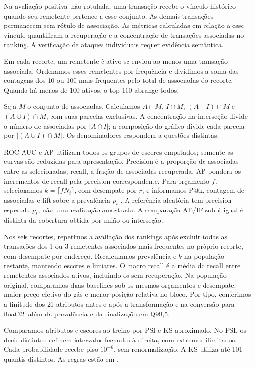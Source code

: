 Na avaliação positiva--não rotulada, uma transação recebe o vínculo histórico quando seu remetente pertence a esse conjunto. As demais transações permanecem sem rótulo de associação. As métricas calculadas em relação a esse vínculo quantificam a recuperação e a concentração de transações associadas no ranking. A verificação de ataques individuais requer evidência semântica.

Em cada recorte, um remetente é ativo se enviou ao menos uma transação associada. Ordenamos esses remetentes por frequência e dividimos a soma das contagens dos 10 ou 100 mais frequentes pelo total de associadas do recorte. Quando há menos de 100 ativos, o top-100 abrange todos.

Seja $M$ o conjunto de associadas. Calculamos $A\cap M$, $I\cap M$, $(A\cap I)\cap M$ e $(A\cup I)\cap M$, com suas parcelas exclusivas. A concentração na interseção divide o número de associadas por $|A\cap I|$; a composição do gráfico divide cada parcela por $|(A\cup I)\cap M|$. Os denominadores respondem a questões distintas.

ROC-AUC e AP utilizam todos os grupos de escores empatados; somente as curvas são reduzidas para apresentação. Precision é a proporção de associadas entre as selecionadas; recall, a fração de associadas recuperada. AP pondera os incrementos de recall pela precision correspondente. Para orçamento $f$, selecionamos $k=\lceil fN_t\rceil$, com desempate por $r$, e informamos P@k, contagem de associadas e lift sobre a prevalência $p_t$ \cite{Saito2015}. A referência aleatória tem precision esperada $p_t$, não uma realização amostrada. A comparação AE/IF sob $k$ igual é distinta da cobertura obtida por união ou interseção.

Nos seis recortes, repetimos a avaliação dos rankings após excluir todas as transações dos 1 ou 3 remetentes associados mais frequentes no próprio recorte, com desempate por endereço. Recalculamos prevalência e $k$ na população restante, mantendo escores e limiares. O macro recall é a média do recall entre remetentes associados ativos, incluindo os sem recuperação. Na população original, comparamos duas baselines sob os mesmos orçamentos e desempate: maior preço efetivo do gás e menor posição relativa no bloco. Por tipo, conferimos a finitude dos 21 atributos antes e após a transformação e na conversão para float32, além da prevalência e da sinalização em Q99,5.

Comparamos atributos e escores ao treino por PSI e KS aproximado. No PSI, os decis distintos definem intervalos fechados à direita, com extremos ilimitados. Cada probabilidade recebe piso $10^{-6}$, sem renormalização. A KS utiliza até 101 quantis distintos. As regras estão em .
